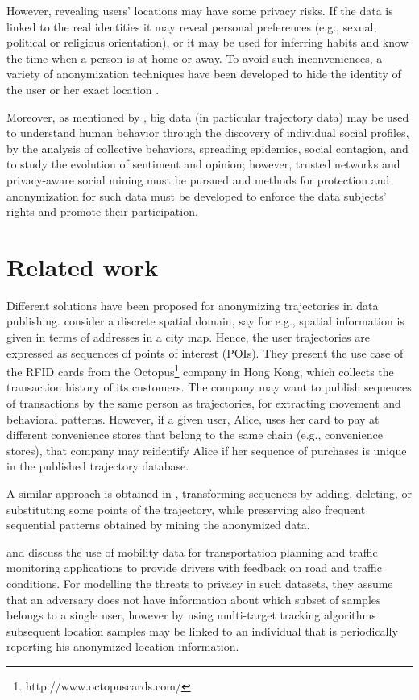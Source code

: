 However, revealing users' locations may have some privacy risks. If the data is linked to the real identities it may reveal personal preferences (e.g., sexual, political or religious orientation), or it may be used for inferring habits and know the time when a person is at home or away.
To avoid such inconveniences, a variety of anonymization techniques have been developed to hide the identity of the user or her exact location \citep[for e.g.]{Terrovitis:2011}.

Moreover, as mentioned by \cite{Giannotti2012}, big data (in particular trajectory data) may be used  to understand human behavior through the discovery of individual social profiles, by the analysis of collective behaviors, spreading epidemics, social contagion, and to study the evolution of sentiment and opinion; however, trusted networks and privacy-aware social mining must be pursued and methods for protection and anonymization for such data must be developed to enforce the data subjects' rights and promote their participation.

\section{Related work}
Different solutions have been proposed for anonymizing trajectories in data publishing. 
\cite{Terrovitis:2008} consider a discrete spatial domain, say for e.g., spatial information is given in terms of addresses in a city map.
Hence, the user trajectories are expressed as sequences of points of interest (POIs).
They present the use case of the RFID cards from the Octopus\footnote{http://www.octopuscards.com/} company in Hong Kong, which collects the transaction history of its customers. The company may want to publish sequences of transactions by the same person as trajectories, for extracting movement and behavioral patterns. However, if a given user, Alice, uses her card to pay at different convenience stores that belong to the same chain (e.g., convenience stores), that company may reidentify Alice if her sequence of purchases is unique in the published trajectory database.


A similar approach is obtained in \cite{Pensa2008}, transforming sequences by adding, deleting, or substituting some points of the trajectory, while preserving also frequent sequential patterns \citep{Agrawal:1995} obtained by mining the anonymized data.


\cite{Hoh2005} and \cite{Hoh06} discuss the use of mobility data for transportation planning and traffic monitoring applications to provide drivers with feedback on road and traffic conditions.
For modelling the threats to privacy in such datasets, they assume that an adversary does not have information about which subset of samples belongs to a single user, 
however by using multi-target tracking algorithms \citep{Reid79analgorithm} subsequent location samples may be linked to an individual that is periodically reporting his anonymized location information.

